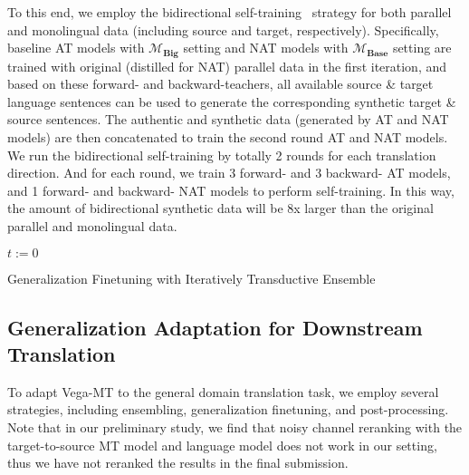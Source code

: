 \documentclass[11pt,a4paper]{article}
\newcommand{\zct}{\color{black}}
\begin{document}
To this end, we employ the bidirectional self-training~\cite{ding2021usyd,liao-etal-2020-multi} strategy for both parallel and monolingual data (including source and target, respectively).
Specifically, baseline AT models with $\mathcal{M}_{\textbf{Big}}$ setting and NAT models with $\mathcal{M}_{\textbf{Base}}$ setting are trained with original (distilled for NAT) parallel data in the first iteration, and based on these forward- and backward-teachers, all available source \& target language sentences can be used to generate the corresponding synthetic target \& source sentences. The authentic and synthetic data (generated by AT and NAT models) are then concatenated to train the second round AT and NAT models. 
We run the bidirectional self-training by totally 2 rounds for each translation direction. And for each round, we train 3 forward- and 3 backward- AT models, and 1 forward- and backward- NAT models to perform self-training. 
In this way, the amount of bidirectional synthetic data will be 8x larger than the original parallel and monolingual data.

\begin{algorithm}[t]
        $t:=0$\\
\caption{Generalization Finetuning {\zct with} Iteratively Transductive Ensemble} 
\label{alg:1}
\end{algorithm}


\subsection{Generalization Adaptation for Downstream Translation}
To adapt Vega-MT to the general domain translation task, we employ several strategies, including ensembling, generalization finetuning, and post-processing. Note that in our preliminary study, we find that noisy channel reranking with the target-to-source MT model and language model does not work in our setting, thus we have not reranked the results in the final submission.
\end{document}
